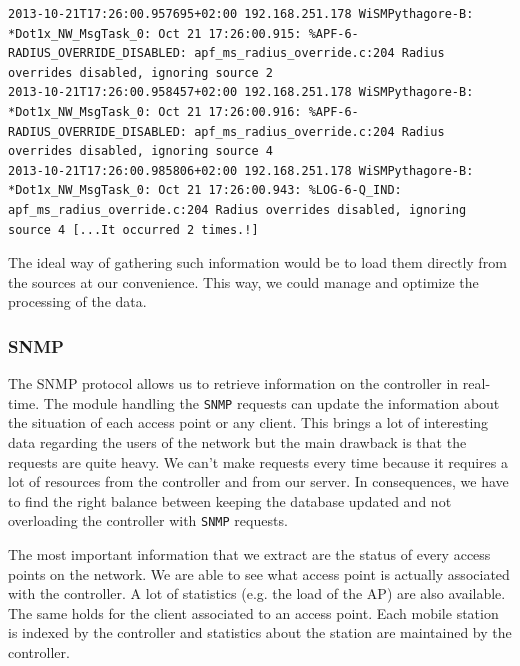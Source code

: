 \begin{lstlisting}[frame=single,breaklines=true,caption={Example of useless WiSM logs}]
2013-10-21T17:26:00.957695+02:00 192.168.251.178 WiSMPythagore-B: *Dot1x_NW_MsgTask_0: Oct 21 17:26:00.915: %APF-6-RADIUS_OVERRIDE_DISABLED: apf_ms_radius_override.c:204 Radius overrides disabled, ignoring source 2 
2013-10-21T17:26:00.958457+02:00 192.168.251.178 WiSMPythagore-B: *Dot1x_NW_MsgTask_0: Oct 21 17:26:00.916: %APF-6-RADIUS_OVERRIDE_DISABLED: apf_ms_radius_override.c:204 Radius overrides disabled, ignoring source 4 
2013-10-21T17:26:00.985806+02:00 192.168.251.178 WiSMPythagore-B: *Dot1x_NW_MsgTask_0: Oct 21 17:26:00.943: %LOG-6-Q_IND: apf_ms_radius_override.c:204 Radius overrides disabled, ignoring source 4 [...It occurred 2 times.!]
\end{lstlisting}

The ideal way of gathering such information would be to load them directly from the sources at our convenience. This way, we could manage and optimize the processing of the data.

\subsubsection{SNMP}
The SNMP protocol allows us to retrieve information on the controller in real-time. The module handling the \texttt{SNMP} requests can update the information about the situation of each access point or any client. This brings a lot of interesting data regarding the users of the network but the main drawback is that the requests are quite heavy. We can't make requests every time because it requires a lot of resources from the controller and from our server. In consequences, we have to find the right balance between keeping the database updated and not overloading the controller with \texttt{SNMP} requests. 

The most important information that we extract are the status of every access points on the network. We are able to see what access point is actually associated with the controller. A lot of statistics (e.g. the load of the AP) are also available. The same holds for the client associated to an access point. Each mobile station is indexed by the controller and statistics about the station are maintained by the controller.

